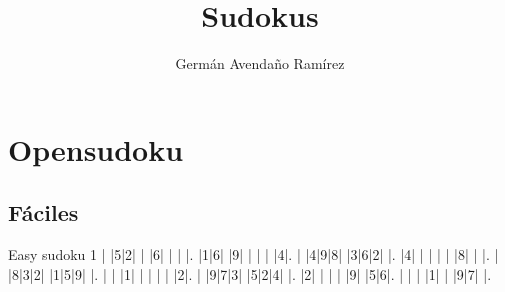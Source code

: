 \documentclass[10pt,a4paper]{article}
\author{Germán Avendaño Ramírez}
\title{Sudokus}
\begin{document}
\section*{Opensudoku}
\subsection*{F\'{a}ciles}
\begin{sudoku}
Easy sudoku 1
| |5|2| | |6| | | |.
|1|6| |9| | | | |4|.
| |4|9|8| |3|6|2| |.
|4| | | | | |8| | |.
| |8|3|2| |1|5|9| |.
| | |1| | | | | |2|.
| |9|7|3| |5|2|4| |.
|2| | | | |9| |5|6|.
| | | |1| | |9|7| |.
\end{sudoku}
\end{document}
